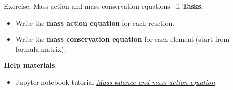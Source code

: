 %
\begin{frame}{Exercise, Mass action and mass conservation equations \, ii}
\textbf{Tasks}:
\begin{itemize}
\item Write the \textbf{mass action equation }for each reaction.
\item Write the \textbf{mass conservation equation }for each element (start from formula matrix).
\end{itemize}
\pause
\textbf{Help materials}: 
\begin{itemize}
\item Jupyter notebook tutorial \href{https://github.com/mtsveta/reaktoro-v2-workshop/blob/main/tutorials/geofluids/mass-balance-mass-action.ipynb}{\textcolor{indigo(dye)}{\it Mass balance and mass action equation}}.
\end{itemize}
\end{frame}
%
%
%
